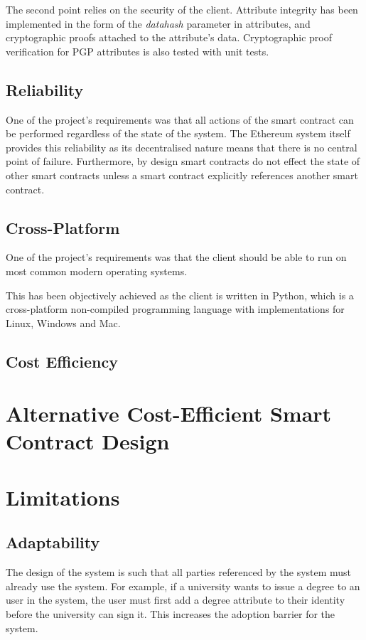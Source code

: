 \documentclass[12pt,a4paper]{report}
\begin{document}
	The second point relies on the security of the client. Attribute integrity has been implemented in the form of the \textit{datahash} parameter in attributes, and cryptographic proofs attached to the attribute's data. Cryptographic proof verification for PGP attributes is also tested with unit tests.
	
	\subsection{Reliability}
	One of the project's requirements was that all actions of the smart contract can be performed regardless of the state of the system. The Ethereum system itself provides this reliability as its decentralised nature means that there is no central point of failure. Furthermore, by design smart contracts do not effect the state of other smart contracts unless a smart contract explicitly references another smart contract.
	
	\subsection{Cross-Platform}
	One of the project's requirements was that the client should be able to run on most common modern operating systems.
	
	This has been objectively achieved as the client is written in Python, which is a cross-platform non-compiled programming language with implementations for Linux, Windows and Mac.\cite{25}
	
	\subsection{Cost Efficiency}
	
	\section{Alternative Cost-Efficient Smart Contract Design}
	\section{Limitations}
	\subsection{Adaptability}
	The design of the system is such that all parties referenced by the system must already use the system. For example, if a university wants to issue a degree to an user in the system, the user must first add a degree attribute to their identity before the university can sign it. This increases the adoption barrier for the system.
	
\end{document}
